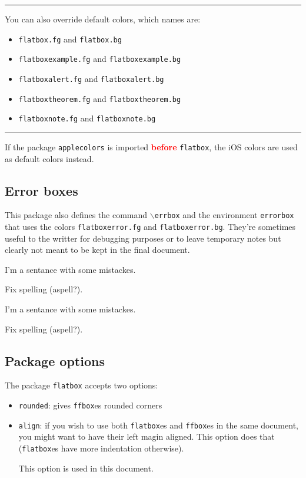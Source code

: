 \documentclass[a4paper]{article}
\newcommand{\dashskip}{%
  \begin{center}
    \rule{3em}{.1pt}
  \end{center}}
\begin{document}
\dashskip
You can also override default colors, which names are:
\begin{itemize}
  \renewcommand{\line}[1]{\item \texttt{flatbox#1.fg} and \texttt{flatbox#1.bg}}
  \line{}
  \line{example}
  \line{alert}
  \line{theorem}
  \line{note}
\end{itemize}

\dashskip
If the package \texttt{applecolors} is imported \textcolor{red}{\textbf{before}}
\texttt{flatbox}, the iOS colors are used as default colors instead.

\subsection{Error boxes}
This package also defines the command \texttt{$\backslash$errbox} and the
environment \texttt{errorbox} that uses the colors \texttt{flatboxerror.fg} and
\texttt{flatboxerror.bg}. They're sometimes useful to the writter for debugging
purposes or to leave temporary notes but clearly not meant to be kept in the final
document.

I'm a sentance with some mistackes.

\begin{errorbox}
  Fix spelling (aspell?).
\end{errorbox}

\begin{latexcode}
I'm a sentance with some mistackes.

\begin{errorbox}
  Fix spelling (aspell?).
\end{errorbox}
\end{latexcode}

\subsection{Package options}
The package \texttt{flatbox} accepts two options:
\begin{itemize}
\item \texttt{rounded}: gives \texttt{ffbox}es rounded corners
\item \texttt{align}: if you wish to use both \texttt{flatbox}es and
  \texttt{ffbox}es in the same document, you might want to have their left magin
  aligned. This option does that (\texttt{flatbox}es have more indentation otherwise).

  This option is used in this document.
\end{itemize}
\end{document}
